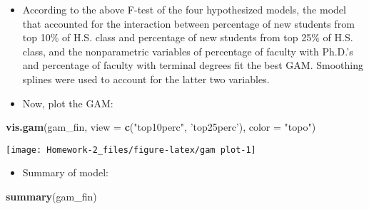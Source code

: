 \documentclass[
]{article}
\newenvironment{Shaded}{\begin{snugshade}}{\end{snugshade}}
\newcommand{\DataTypeTok}[1]{\textcolor[rgb]{0.13,0.29,0.53}{#1}}
\newcommand{\KeywordTok}[1]{\textcolor[rgb]{0.13,0.29,0.53}{\textbf{#1}}}
\newcommand{\NormalTok}[1]{#1}
\newcommand{\StringTok}[1]{\textcolor[rgb]{0.31,0.60,0.02}{#1}}
\providecommand{\tightlist}{%
  \setlength{\itemsep}{0pt}\setlength{\parskip}{0pt}}
\begin{document}
\begin{itemize}
\item
  According to the above F-test of the four hypothesized models, the
  model that accounted for the interaction between percentage of new
  students from top 10\% of H.S. class and percentage of new students
  from top 25\% of H.S. class, and the nonparametric variables of
  percentage of faculty with Ph.D.'s and percentage of faculty with
  terminal degrees fit the best GAM. Smoothing splines were used to
  account for the latter two variables.
\item
  Now, plot the GAM:
\end{itemize}

\begin{Shaded}
\begin{Highlighting}[]
\KeywordTok{vis.gam}\NormalTok{(gam_fin, }\DataTypeTok{view =} \KeywordTok{c}\NormalTok{(}\StringTok{"top10perc"}\NormalTok{, }\StringTok{'top25perc'}\NormalTok{), }\DataTypeTok{color =} \StringTok{"topo"}\NormalTok{)}
\end{Highlighting}
\end{Shaded}

\texttt{[image: Homework-2\_files/figure-latex/gam plot-1]}

\begin{itemize}
\tightlist
\item
  Summary of model:
\end{itemize}

\begin{Shaded}
\begin{Highlighting}[]
\KeywordTok{summary}\NormalTok{(gam_fin)}
\end{Highlighting}
\end{Shaded}
\end{document}

